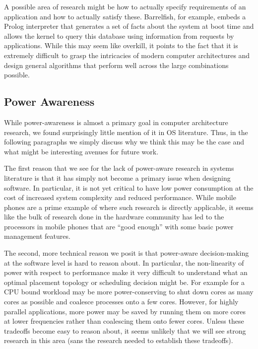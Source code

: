 A possible area of research might be how to actually specify requirements of an application and how to actually satisfy these. Barrelfish, for example, embeds a Prolog interpreter that generates a set of facts about the system at boot time and allows the kernel to query this database using information from requests by applications. While this may seem like overkill, it points to the fact that it is extremely difficult to grasp the intricacies of modern computer architectures and design general algorithms that perform well across the large combinations possible.

\subsection{Power Awareness}
While power-awareness is almost a primary goal in computer architecture research, we found surprisingly little mention of it in OS literature. Thus, in the following paragraphs we simply discuss why we think this may be the case and what might be interesting avenues for future work.

The first reason that we see for the lack of power-aware research in systems literature is that it has simply not become a primary issue when designing software. In particular, it is not yet critical to have low power consumption at the cost of increased system complexity and reduced performance. While mobile phones are a prime example of where such research is directly applicable, it seems like the bulk of research done in the hardware community has led to the processors in mobile phones that are ``good enough'' with some basic power management features.

The second, more technical reason we posit is that power-aware decision-making at the software level is hard to reason about. In particular, the non-linearity of power with respect to performance make it very difficult to understand what an optimal placement topology or scheduling decision might be. For example for a CPU bound workload may be more power-conserving to shut down cores as many cores as possible and coalesce processes onto a few cores. However, for highly parallel applications, more power may be saved by running them on more cores at lower frequencies rather than coalescing them onto fewer cores. Unless these tradeoffs become easy to reason about, it seems unlikely that we will see strong research in this area (sans the research needed to establish these tradeoffs).